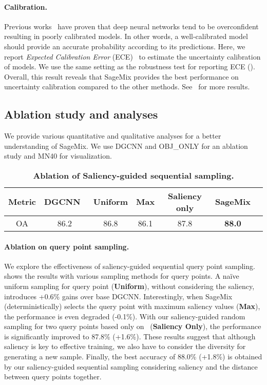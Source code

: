\documentclass{article}
\begin{document}
\paragraph{Calibration.}
Previous works~\cite{guo2017calibration, kumar2018trainable} have proven that deep neural networks tend to be overconfident resulting in poorly calibrated models. 
In other words, a well-calibrated model should provide an accurate probability according to its predictions.
Here, we report \textit{Expected Calibration Error} (ECE)~\cite{guo2017calibration} to estimate the uncertainty calibration of models.
We use the same setting as the robustness test for reporting ECE ().
Overall, this result reveals that SageMix provides the best performance on uncertainty calibration compared to the other methods. See~ for more results.

\subsection{Ablation study and analyses}

\label{sec:exp.2}
We provide various quantitative and qualitative analyses for a better understanding of SageMix.
We use DGCNN and OBJ\_ONLY for an ablation study and MN40 for visualization.


\begin{table}[t!]
  \centering
\setlength{\tabcolsep}{4pt}
\renewcommand{\arraystretch}{1.1}
    \caption{\textbf{Ablation of Saliency-guided sequential sampling.}}
  \begin{tabular}{c|c|ccccc}
    \toprule
    \textbf{Metric} & DGCNN~\cite{wang2019dynamic} & Uniform & Max & Saliency only & \textbf{\textbf{SageMix}}\\
    \midrule
    \midrule
    OA & 86.2 & 86.8 & 86.1 & 87.8  & \textbf{88.0} \\
    \bottomrule
  \end{tabular}
  \label{table:ablation}
\end{table} 
 \paragraph{Ablation on query point sampling.} 
We explore the effectiveness of saliency-guided sequential query point sampling. 
 shows the results with various sampling methods for query points. 
A na\"ive uniform sampling for query point (\textbf{Uniform}), without considering the saliency, introduces +0.6\% gains over base DGCNN. 
Interestingly, when SageMix (deterministically) selects the query point with maximum saliency values (\textbf{Max}), the performance is even degraded (-0.1\%). 
With our saliency-guided random sampling for two query points based only on~ (\textbf{Saliency Only}), the performance is significantly improved to 87.8\% (+1.6\%).
These results suggest that although saliency is key to effective training, we also have to consider the diversity for generating a new sample. 
Finally, the best accuracy of 88.0\% (+1.8\%) is obtained by our saliency-guided sequential sampling considering saliency and the distance between query points together.
\end{document}
